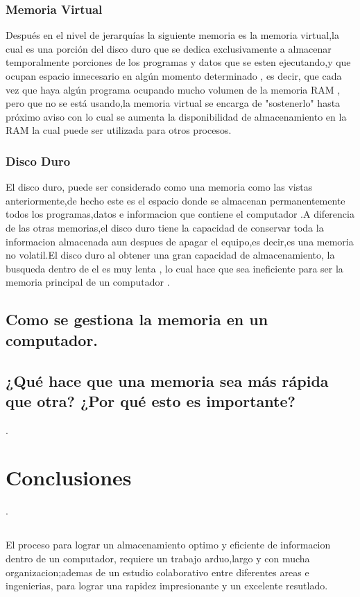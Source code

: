 \documentclass{article}
\begin{document}
\subsubsection{Memoria Virtual}
Después en el nivel de jerarquías la siguiente memoria es la memoria virtual,la cual es una porción del disco duro que se dedica exclusivamente a almacenar temporalmente porciones de los programas y datos que se esten ejecutando,y que ocupan espacio innecesario en algún momento determinado , es decir, que cada vez que haya algún programa ocupando mucho volumen de la memoria RAM , pero que no se está usando,la memoria virtual se encarga de "sostenerlo" hasta próximo aviso con lo cual se aumenta la disponibilidad de almacenamiento en la RAM la cual puede ser utilizada para otros procesos\cite{augusto}.

\subsubsection{Disco Duro}
El disco duro, puede ser considerado como una memoria como las vistas anteriormente,de hecho este es el espacio donde se almacenan permanentemente todos los programas,datos e informacion que contiene el computador .A diferencia de las otras memorias,el disco duro tiene la capacidad de conservar toda la informacion almacenada aun despues de apagar el equipo,es decir,es una memoria no volatil.El disco duro al obtener una gran capacidad de almacenamiento, la busqueda dentro de el es muy lenta , lo cual hace que sea ineficiente para ser la memoria principal de un computador \cite{disco}.

\subsection{Como se gestiona la memoria en un computador.} \label{contenido}

\subsection{¿Qué hace que una memoria sea más rápida que otra? ¿Por qué esto es importante?}.\label{contenido}

\section{Conclusiones}.\label{contenido}
\subsection{}
El proceso para lograr un almacenamiento optimo y eficiente de informacion dentro de un computador, requiere un trabajo arduo,largo y con mucha organizacion;ademas de un estudio colaborativo entre diferentes areas e ingenierias, para lograr una rapidez impresionante y un excelente resutlado.



\end{document}
